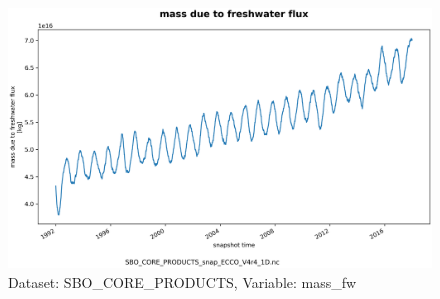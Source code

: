 \begin{figure}[H]
\centering
\includegraphics[scale=0.55]{../images/plots/oneD_plots/SBO_Core_Products/mass_fw.png}
\caption{Dataset: SBO\_CORE\_PRODUCTS, Variable: mass\_fw}
\label{tab:table-SBO_CORE_PRODUCTS_mass_fw-Plot}
\end{figure}
\newpage
\pagebreak
